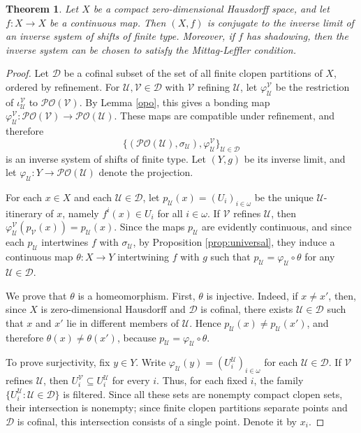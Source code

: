 \documentclass[10pt,a4paper]{amsart}
\newtheorem{theorem}{Theorem}[section]
\numberwithin{equation}{section}
\begin{document}
\begin{theorem}\label{zerolift}
Let $X$ be a compact zero-dimensional Hausdorff space, and let $f:X\to X$ be a
continuous map. Then $(X,f)$ is conjugate to the inverse limit of an inverse
system of shifts of finite type. Moreover, if $f$ has shadowing, then the
inverse system can be chosen to satisfy the Mittag-Leffler condition.
\end{theorem}

\begin{proof}
Let $\mathcal D$ be a cofinal subset of the set of all finite clopen
partitions of $X$, ordered by refinement. For $\mathcal U,\mathcal V\in\mathcal D$
with $\mathcal V$ refining $\mathcal U$, let
$\varphi_{\mathcal U}^{\mathcal V}$ be the restriction of
$\iota_{\mathcal U}^{\mathcal V}$ to $\mathcal{PO}(\mathcal V)$. By Lemma
\ref{opo}, this gives a bonding map
$\varphi_{\mathcal U}^{\mathcal V}:\mathcal{PO}(\mathcal V)\to
\mathcal{PO}(\mathcal U)$. These maps are compatible under refinement, and
therefore
\[
    \{(\mathcal{PO}(\mathcal U),\sigma_{\mathcal U}),
    \varphi_{\mathcal U}^{\mathcal V}\}_{\mathcal U\in\mathcal D}
\]
is an inverse system of shifts of finite type. Let $(Y,g)$ be its inverse limit,
and let $\varphi_{\mathcal U}:Y\to\mathcal{PO}(\mathcal U)$ denote the 
projection.

For each $x\in X$ and each $\mathcal U\in\mathcal D$, let
$p_{\mathcal U}(x)=(U_i)_{i\in\omega}$ be the unique $\mathcal U$-itinerary of
$x$, namely $f^i(x)\in U_i$ for all $i\in\omega$. If $\mathcal V$ refines
$\mathcal U$, then
$\varphi_{\mathcal U}^{\mathcal V}(p_{\mathcal V}(x))=p_{\mathcal U}(x)$.
Since the maps $p_{\mathcal U}$ are evidently continuous, and since each $p_{\mathcal U}$ intertwines $f$ with
$\sigma_{\mathcal U}$, by Proposition \ref{prop:universal}, they induce a continuous map
$\theta:X\to Y$ intertwining $f$ with $g$ such that $p_{\mathcal U} = \varphi_{\mathcal U}\circ \theta$ for any $\mathcal U\in \mathcal D$.

We prove that $\theta$ is a homeomorphism. First, $\theta$ is injective. Indeed,
if $x\neq x'$, then, since $X$ is zero-dimensional Hausdorff and $\mathcal D$ is
cofinal, there exists $\mathcal U\in\mathcal D$ such that $x$ and $x'$ lie in
different members of $\mathcal U$. Hence $p_{\mathcal U}(x)\neq
p_{\mathcal U}(x')$, and therefore $\theta(x)\neq\theta(x')$, because $p_{\mathcal U} = \varphi_{\mathcal U}\circ \theta$.

To prove surjectivity, fix $y\in Y$. Write
$\varphi_{\mathcal U}(y)=(U_i^{\mathcal U})_{i\in\omega}$ for each
$\mathcal U\in\mathcal D$. If $\mathcal V$ refines $\mathcal U$, then
$U_i^{\mathcal V}\subseteq U_i^{\mathcal U}$ for every $i$. Thus, for each
fixed $i$, the family $\{U_i^{\mathcal U}:\mathcal U\in\mathcal D\}$ is
filtered. Since all these sets are nonempty compact clopen sets, their
intersection is nonempty; since finite clopen partitions separate points and
$\mathcal D$ is cofinal, this intersection consists of a single point. Denote it
by $x_i$.


\end{proof}
\end{document}
